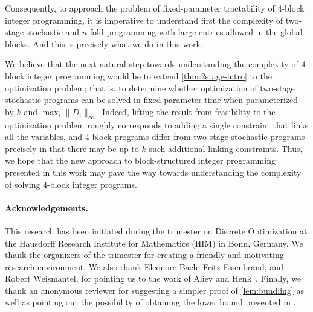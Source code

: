 \documentclass{article}
\makeatletter
\newcommand{\Oh}{{\mathcal{O}}}
\newcommand\IfRestateTF{%
  \ifx\label\thmt@gobble@label %
    \expandafter\@firstoftwo
  \else
    \expandafter\@secondoftwo
  \fi
}
\newcommand{\RestateRemark}{\IfRestateTF{{\normalfont\bfseries (Restated) }}{}}
\makeatother
\begin{document}

Consequently, to approach the problem of fixed-parameter tractability of $4$-block integer programming, it is imperative to understand first the complexity of two-stage stochastic and $n$-fold programming with large entries allowed in the global blocks. And this is precisely what we do in this work.

We believe that the next natural step towards understanding the complexity of $4$-block integer programming would be to extend \cref{thm:2stage-intro} to the optimization problem; that is, to determine whether optimization of two-stage stochastic programs can be solved in fixed-parameter time when parameterized by $k$ and $\max_i \|D_i\|_\infty$. Indeed, lifting the result from feasibility to the optimization problem roughly corresponds to adding a single constraint that links all the variables, and $4$-block programs differ from two-stage stochastic programs precisely in that there may be up to $k$ such additional linking constraints. Thus, we hope that the  new approach to block-structured integer programming presented in this work may pave the way towards understanding the complexity of solving $4$-block integer programs.

\paragraph*{Acknowledgements.} This research has been initiated during the trimester on Discrete Optimization at the Hausdorff Research Institute for Mathematics (HIM) in Bonn, Germany. We thank the organizers of the trimester for creating a friendly and motivating research environment. We also thank Eleonore Bach, Fritz Eisenbrand, and Robert Weismantel, for pointing us to the work of Aliev and Henk~\cite{AlievH10}. Finally, we thank an anonymous reviewer for suggesting a simpler proof of \cref{lem:bundling} as well as pointing out the possibility of obtaining the lower bound presented in .
\end{document}
